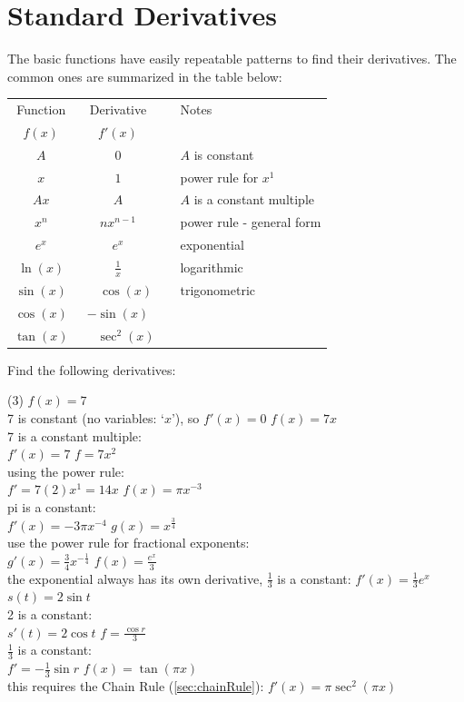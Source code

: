 \section{Standard Derivatives}
The basic functions have easily repeatable patterns to find their derivatives. The common ones are summarized in the table below:
\renewcommand\arraystretch{1.2}
\begin{center}
	\begin{tabular}{ccll}
		\toprule
		Function& Derivative&&Notes\\
		$f(x)$ & $f'(x)$  &&\\ \midrule
		$A$&0&&$A$ is constant\\
		$x$&$1$&&power rule for $x^1$\\
		$Ax$&$A$&&$A$ is a constant multiple\\ \midrule
		$x^n$ & $nx^{n-1}$ &&power rule - general form\\
		$e^x$ & $e^x$  && exponential\\
		$\ln(x)$ & $\frac{1}{x}$ &&logarithmic\\ \midrule
		$\sin(x)$ & $\phantom{-}\cos(x)$  && trigonometric\\
		$\cos(x)$ & $-\sin(x)$ && \\
		$\tan(x)$ & $\phantom{-}\sec^2(x)$ && \\ \bottomrule
	\end{tabular}
\end{center}\clearpage
\example Find the following derivatives:
\begin{tasks}[after-item-skip=3ex](3)
	\task $f(x)=7$\\ 7 is constant (no variables: `$x$'), so $f'(x)=0$
	\task $f(x)=7x$\\ 7 is a constant multiple: \\ $f'(x)=7$
	\task $f=7x^2$\\ using the power rule:\\ $f'=7(2)x^1=14x$
	\task $f(x)=\pi x^{-3}$\\pi is a constant:\\ $f'(x)=-3\pi x^{-4}$
	\task $\displaystyle g(x)=x^{\frac{3}{4}}$\\ use the power rule for fractional exponents:\\ $\displaystyle g'(x)=\frac{3}{4}x^{-\frac{1}{4}}$
	\task $f(x)=\displaystyle\frac{e^x}{3}$\\ the exponential always has its own derivative, $\frac{1}{3}$ is a constant: $f'(x)=\frac{1}{3}e^x$
	\task $s(t)=2\sin t$\\ 2 is a constant: \\$s'(t)=2\cos t$
	\task $f=\displaystyle\frac{\cos r}{3}$\\ $\frac{1}{3}$ is a constant:\\ $f'=-\frac{1}{3}\sin r$
	\task $f(x)=\tan (\pi x)$\\ this requires the Chain Rule (\ref{sec:chainRule}): $f'(x)=\pi\sec^2 (\pi x)$
\end{tasks}

